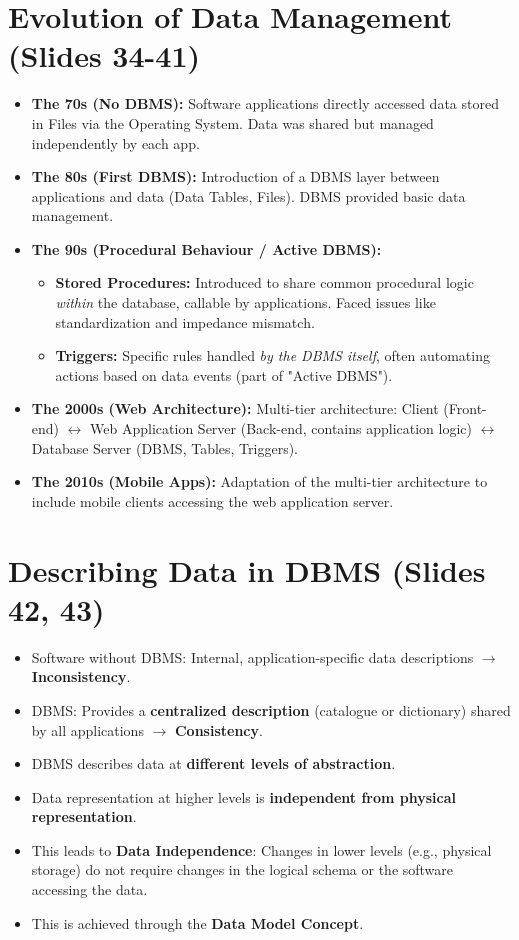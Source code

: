\documentclass{article}
\begin{document}
	\section{Evolution of Data Management (Slides 34-41)}
	\begin{itemize}
		\item \textbf{The 70s (No DBMS):} Software applications directly accessed data stored in Files via the Operating System. Data was shared but managed independently by each app.
		\item \textbf{The 80s (First DBMS):} Introduction of a DBMS layer between applications and data (Data Tables, Files). DBMS provided basic data management.
		\item \textbf{The 90s (Procedural Behaviour / Active DBMS):}
		\begin{itemize}
			\item \textbf{Stored Procedures:} Introduced to share common procedural logic \emph{within} the database, callable by applications. Faced issues like standardization and impedance mismatch.
			\item \textbf{Triggers:} Specific rules handled \emph{by the DBMS itself}, often automating actions based on data events (part of "Active DBMS").
		\end{itemize}
		\item \textbf{The 2000s (Web Architecture):} Multi-tier architecture: Client (Front-end) $\leftrightarrow$ Web Application Server (Back-end, contains application logic) $\leftrightarrow$ Database Server (DBMS, Tables, Triggers).
		\item \textbf{The 2010s (Mobile Apps):} Adaptation of the multi-tier architecture to include mobile clients accessing the web application server.
	\end{itemize}
	
	\section{Describing Data in DBMS (Slides 42, 43)}
	\begin{itemize}
		\item Software without DBMS: Internal, application-specific data descriptions $\rightarrow$ \textbf{Inconsistency}.
		\item DBMS: Provides a \textbf{centralized description} (catalogue or dictionary) shared by all applications $\rightarrow$ \textbf{Consistency}.
		\item DBMS describes data at \textbf{different levels of abstraction}.
		\item Data representation at higher levels is \textbf{independent from physical representation}.
		\item This leads to \textbf{Data Independence}: Changes in lower levels (e.g., physical storage) do not require changes in the logical schema or the software accessing the data.
		\item This is achieved through the \textbf{Data Model Concept}.
	\end{itemize}
	
\end{document}

